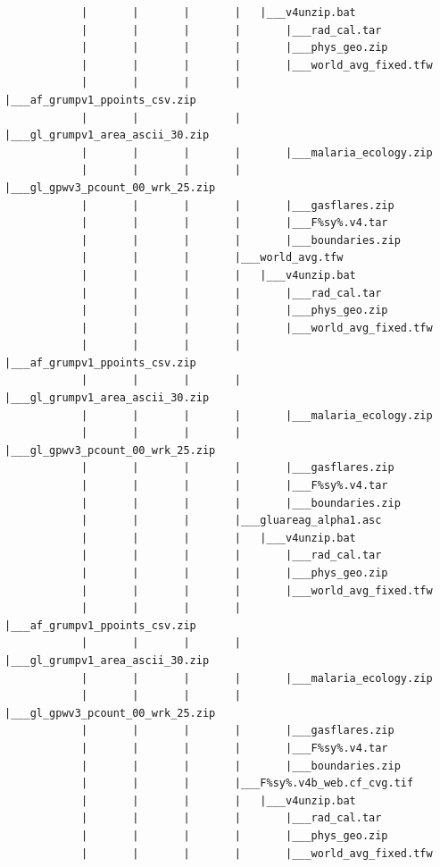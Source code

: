 \documentclass[
]{book}
\begin{document}
\begin{verbatim}
            |       |       |       |   |___v4unzip.bat
            |       |       |       |       |___rad_cal.tar
            |       |       |       |       |___phys_geo.zip
            |       |       |       |       |___world_avg_fixed.tfw
            |       |       |       |       |___af_grumpv1_ppoints_csv.zip
            |       |       |       |       |___gl_grumpv1_area_ascii_30.zip
            |       |       |       |       |___malaria_ecology.zip
            |       |       |       |       |___gl_gpwv3_pcount_00_wrk_25.zip
            |       |       |       |       |___gasflares.zip
            |       |       |       |       |___F%sy%.v4.tar
            |       |       |       |       |___boundaries.zip
            |       |       |       |___world_avg.tfw
            |       |       |       |   |___v4unzip.bat
            |       |       |       |       |___rad_cal.tar
            |       |       |       |       |___phys_geo.zip
            |       |       |       |       |___world_avg_fixed.tfw
            |       |       |       |       |___af_grumpv1_ppoints_csv.zip
            |       |       |       |       |___gl_grumpv1_area_ascii_30.zip
            |       |       |       |       |___malaria_ecology.zip
            |       |       |       |       |___gl_gpwv3_pcount_00_wrk_25.zip
            |       |       |       |       |___gasflares.zip
            |       |       |       |       |___F%sy%.v4.tar
            |       |       |       |       |___boundaries.zip
            |       |       |       |___gluareag_alpha1.asc
            |       |       |       |   |___v4unzip.bat
            |       |       |       |       |___rad_cal.tar
            |       |       |       |       |___phys_geo.zip
            |       |       |       |       |___world_avg_fixed.tfw
            |       |       |       |       |___af_grumpv1_ppoints_csv.zip
            |       |       |       |       |___gl_grumpv1_area_ascii_30.zip
            |       |       |       |       |___malaria_ecology.zip
            |       |       |       |       |___gl_gpwv3_pcount_00_wrk_25.zip
            |       |       |       |       |___gasflares.zip
            |       |       |       |       |___F%sy%.v4.tar
            |       |       |       |       |___boundaries.zip
            |       |       |       |___F%sy%.v4b_web.cf_cvg.tif
            |       |       |       |   |___v4unzip.bat
            |       |       |       |       |___rad_cal.tar
            |       |       |       |       |___phys_geo.zip
            |       |       |       |       |___world_avg_fixed.tfw

\end{verbatim}
\end{document}
